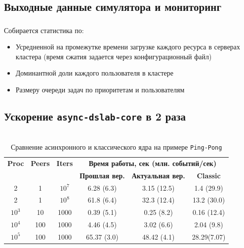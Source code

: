 \documentclass[t]{beamer}  %
\begin{document}
\subsection{Выходные данные симулятора и мониторинг}\label{output-monitoring}
\begin{frame}[fragile]
	\frametitle{\insertsection}
	\framesubtitle{\insertsubsection}
	Собирается статистика по:
	\begin{itemize}
		\item Усредненной на промежутке времени загрузке каждого ресурса в серверах кластера (время сжатия задается через конфигурационный файл)
		\item Доминантной доли каждого пользователя в кластере 
		\item Размеру очереди задач по приоритетам и пользователям
	\end{itemize}
\end{frame}

\subsection{Ускорение \texttt{async-dslab-core} в 2 раза}\label{async-speedup}
\begin{frame}[fragile]
	\frametitle{\insertsection}
	\framesubtitle{\insertsubsection}

	\begin{columns}
		\begin{column}{1.1\linewidth}
	\vspace{0.5cm}
	\begin{table}[H]
		\centering
		\fontsize{9}{14}\selectfont
		\begin{tabular}{|c|c|c|c|c|c|}
			\hline
			\textbf{Proc} & \textbf{Peers} & \textbf{Iters} & \multicolumn{3}{c|}{\textbf{Время работы, сек (млн. событий/сек)}}  \\ 
			\cline{4-6} 
			& & & \hspace{0.2cm}\textbf{Прошлая вер.}\hspace{0.2cm} & \textbf{Актуальная вер.} & \textbf{Classic}    \\
			\hline 
			2 & 1 & $10^7$ & 6.28 (6.3)& 3.15 (12.5) & 1.4 (29.9) \\ 
			\hline 
			2 & 1 & $10^8$ & 61.8 (6.4)& 32.3 (12.4) & 13.2 (30.0)\\
			\hline 
			$10^3$ & 10 & 1000 & 0.39 (5.1) & 0.25 (8.2) & 0.16 (12.4)\\
			\hline
			$10^4$ & 100 & 1000 & 4.46 (4.5) & 3.02 (6.6) & 2.04 (9.8)\\ 
			\hline
			$10^5$ & 100 & 1000 & 65.37 (3.0)& 48.42 (4.1) & 28.29(7.07) \\
			\hline
		\end{tabular}
		\caption*{Сравнение асинхронного и классического ядра на примере \texttt{Ping-Pong}}
	\end{table}
\end{column} 
\end{columns}

\end{frame}
\end{document}
